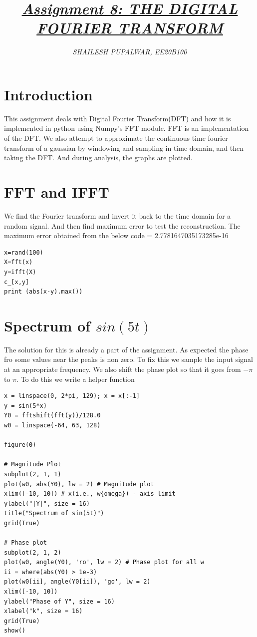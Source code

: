 \documentclass{article}
\title{\underline{\textit{\Large{Assignment 8: THE DIGITAL FOURIER TRANSFORM}}}}
\author{\textit{ SHAILESH PUPALWAR, EE20B100 }}
\begin{document}
\maketitle

\section{Introduction}
This assignment deals with Digital Fourier Transform(DFT) and how it is implemented in python using Numpy's FFT module. FFT is an implementation of the DFT.  We also attempt to approximate the continuous time fourier transform of a gaussian by windowing and sampling in time domain, and then taking the DFT. And during analysis, the graphs are plotted.

\section {FFT and IFFT}
We find the Fourier transform and invert it back to the time domain for a random signal. And then find maximum error to test the reconstruction.
\newline\newline
The maximum error obtained from the below code = 2.7781647035173285e-16\newline\newline

\lstset{language=Python}
\lstset{frame=lines}
\lstset{basicstyle=\footnotesize}
\newline
\newline
\begin{lstlisting}
x=rand(100)
X=fft(x)
y=ifft(X)
c_[x,y]
print (abs(x-y).max())
\end{lstlisting}

\section{Spectrum of $sin(5t)$}
The solution for this is already a part of the assignment. As expected the phase fro some values near the peaks is non zero. To fix this we sample the input signal at an appropriate frequency. We also shift the phase plot so that it goes from $-\pi$ to $\pi$. To do this we write a helper function

\begin{lstlisting}
x = linspace(0, 2*pi, 129); x = x[:-1]
y = sin(5*x)
Y0 = fftshift(fft(y))/128.0
w0 = linspace(-64, 63, 128)

figure(0)

# Magnitude Plot
subplot(2, 1, 1)  
plot(w0, abs(Y0), lw = 2) # Magnitude plot
xlim([-10, 10]) # x(i.e., w{omega}) - axis limit 
ylabel("|Y|", size = 16)
title("Spectrum of sin(5t)")
grid(True)

# Phase plot
subplot(2, 1, 2)
plot(w0, angle(Y0), 'ro', lw = 2) # Phase plot for all w 
ii = where(abs(Y0) > 1e-3)
plot(w0[ii], angle(Y0[ii]), 'go', lw = 2) 
xlim([-10, 10])
ylabel("Phase of Y", size = 16)
xlabel("k", size = 16)
grid(True)
show()
\end{lstlisting}
\end{document}
